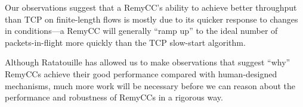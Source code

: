 Our observations suggest that a RemyCC's ability to achieve better
throughput than TCP on finite-length flows is mostly due to its
quicker response to changes in conditions---a RemyCC will generally
``ramp up'' to the ideal number of packets-in-flight more quickly than
the TCP slow-start algorithm.

Although Ratatouille has allowed us to make observations that suggest
``why'' RemyCCs achieve their good performance compared with
human-designed mechanisms, much more work will be necessary before we
can reason about the performance and robustness of RemyCCs in a
rigorous way.


